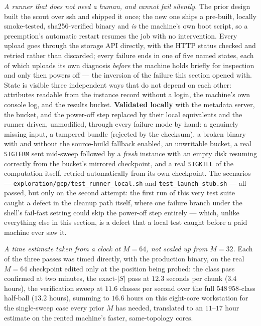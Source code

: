 \documentclass[11pt,a4paper]{article}
\theoremstyle{definition}
\theoremstyle{plain}
\begin{document}
\emph{A runner that does not need a human, and cannot fail silently.} The prior design built the
scout over ssh and shipped it once; the new one ships a pre-built, locally smoke-tested,
sha256-verified binary and \emph{is} the machine's own boot script, so a preemption's automatic
restart resumes the job with no intervention. Every upload goes through the storage API directly,
with the HTTP status checked and retried rather than discarded; every failure ends in one of five
named states, each of which uploads its own diagnosis \emph{before} the machine holds briefly for
inspection and only then powers off --- the inversion of the failure this section opened with.
State is visible three independent ways that do not depend on each other: attributes readable from
the instance record without a login, the machine's own console log, and the results bucket.
\textbf{Validated locally} with the metadata server, the bucket, and the power-off step replaced
by their local equivalents and the runner driven, unmodified, through every failure mode by hand:
a genuinely missing input, a tampered bundle (rejected by the checksum), a broken binary with and
without the source-build fallback enabled, an unwritable bucket, a real \texttt{SIGTERM} sent
mid-sweep followed by a \emph{fresh} instance with an empty disk resuming correctly from the
bucket's mirrored checkpoint, and a real \texttt{SIGKILL} of the computation itself, retried
automatically from its own checkpoint. The scenarios --- \texttt{exploration/gcp/test\_runner\_local.sh}
and \texttt{test\_launch\_stub.sh} --- all passed, but only on the second attempt:
the first run of this very test suite caught a defect in the cleanup path itself, where one
failure branch under the shell's fail-fast setting could skip the power-off step entirely ---
which, unlike everything else in this section, is a defect that a local test caught before a
paid machine ever saw it.

\emph{A time estimate taken from a clock at $M=64$, not scaled up from $M=32$.} Each of the three
passes was timed directly, with the production binary, on the real $M=64$ checkpoint edited only
at the position being probed: the class pass confirmed at two minutes, the exact-$|S|$ pass at
$12.3$ seconds per chunk ($3.4$ hours), the verification sweep at $11.6$ classes per second over
the full $548\,958$-class half-ball ($13.2$ hours), summing to $16.6$ hours on this eight-core
workstation for the single-sweep case every prior $M$ has needed, translated to an $11$--$17$
hour estimate on the rented machine's faster, same-topology cores.
\end{document}
